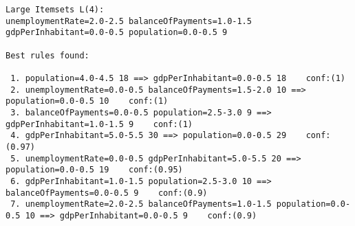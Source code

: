 \begin{lstlisting}[basicstyle=\footnotesize\ttfamily,numbers=none]
Large Itemsets L(4):
unemploymentRate=2.0-2.5 balanceOfPayments=1.0-1.5 gdpPerInhabitant=0.0-0.5 population=0.0-0.5 9

Best rules found:

 1. population=4.0-4.5 18 ==> gdpPerInhabitant=0.0-0.5 18    conf:(1)
 2. unemploymentRate=0.0-0.5 balanceOfPayments=1.5-2.0 10 ==> population=0.0-0.5 10    conf:(1)
 3. balanceOfPayments=0.0-0.5 population=2.5-3.0 9 ==> gdpPerInhabitant=1.0-1.5 9    conf:(1)
 4. gdpPerInhabitant=5.0-5.5 30 ==> population=0.0-0.5 29    conf:(0.97)
 5. unemploymentRate=0.0-0.5 gdpPerInhabitant=5.0-5.5 20 ==> population=0.0-0.5 19    conf:(0.95)
 6. gdpPerInhabitant=1.0-1.5 population=2.5-3.0 10 ==> balanceOfPayments=0.0-0.5 9    conf:(0.9)
 7. unemploymentRate=2.0-2.5 balanceOfPayments=1.0-1.5 population=0.0-0.5 10 ==> gdpPerInhabitant=0.0-0.5 9    conf:(0.9)
\end{lstlisting}
